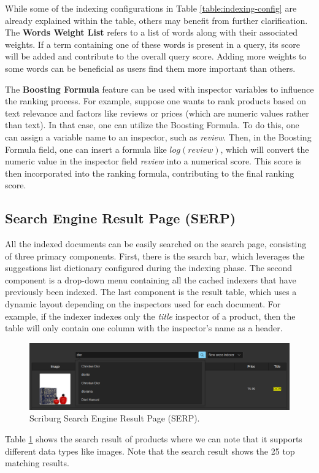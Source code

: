 While some of the indexing configurations in Table \ref{table:indexing-config} are already explained within the table, others may benefit from further clarification. The \textbf{Words Weight List} refers to a list of words along with their associated weights. If a term containing one of these words is present in a query, its score will be added and contribute to the overall query score. Adding more weights to some words can be beneficial as users find them more important than others. 

The \textbf{Boosting Formula} feature can be used with inspector variables to influence the ranking process. For example, suppose one wants to rank products based on text relevance and factors like reviews or prices (which are numeric values rather than text). In that case, one can utilize the Boosting Formula. To do this, one can assign a variable name to an inspector, such as \textit{review}. Then, in the Boosting Formula field, one can insert a formula like $log(review)$, which will convert the numeric value in the inspector field \textit{review} into a numerical score. This score is then incorporated into the ranking formula, contributing to the final ranking score.

\subsection{Search Engine Result Page (SERP)}
All the indexed documents can be easily searched on the search page, consisting of three primary components. First, there is the search bar, which leverages the suggestions list dictionary configured during the indexing phase. The second component is a drop-down menu containing all the cached indexers that have previously been indexed. The last component is the result table, which uses a dynamic layout depending on the inspectors used for each document. For example, if the indexer indexes only the \textit{title} inspector of a product, then the table will only contain one column with the inspector's name as a header. 
\begin{figure}[ht]	
     \centering
     \includegraphics[width=13cm]{figures/demo-12.png}
     \caption{Scriburg Search Engine Result Page (SERP).}
     \label{fig:search-result-view}
\end{figure}


Table \ref{fig:search-result-view} shows the search result of products where we can note that it supports different data types like images. Note that the search result shows the 25 top matching results. 